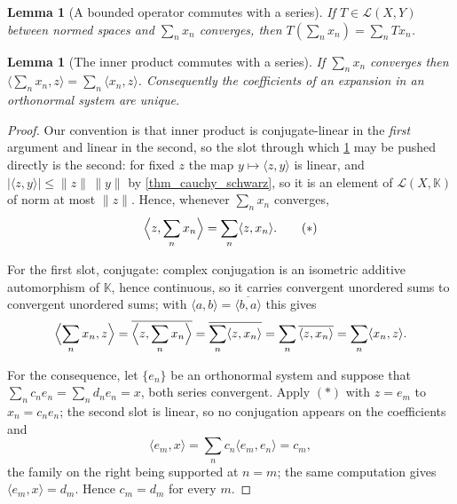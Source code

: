 \documentclass[a4paper]{report}
\theoremstyle{plain}
\newtheorem{lemma}[theorem]{Lemma}
\theoremstyle{definition}
\theoremstyle{remark}
\begin{document}
\begin{lemma}[A bounded operator commutes with a series]
  \label{lem_operator_through_series}
  If $T \in \mathcal{L}(X,Y)$ between normed spaces and $\sum_n x_n$ converges, then
  $T(\sum_n x_n) = \sum_n Tx_n$.
\end{lemma}


\begin{lemma}[The inner product commutes with a series]
  \label{lem_inner_through_series}
  If $\sum_n x_n$ converges then
  $\langle \sum_n x_n, z\rangle = \sum_n \langle x_n, z\rangle$.  Consequently the
  coefficients of an expansion in an orthonormal system are unique.
\end{lemma}
\begin{proof}
  Our convention is that inner product is conjugate-linear in the \emph{first} argument and linear in
  the second, so the slot through which \cref{lem_operator_through_series} may be pushed
  directly is the second: for fixed $z$ the map $y \mapsto \langle z,y\rangle$ is linear,
  and $|\langle z,y\rangle| \le \|z\|\,\|y\|$ by \cref{thm_cauchy_schwarz}, so it is an
  element of $\mathcal{L}(X,\mathbb{K})$ of norm at most $\|z\|$.
  Hence, whenever $\sum_n x_n$ converges,
  \begin{equation}
    \Bigl\langle z, \sum_n x_n\Bigr\rangle = \sum_n \langle z, x_n\rangle . \tag{$*$}
  \end{equation}

  For the first slot, conjugate: complex conjugation is an isometric additive automorphism
  of $\mathbb{K}$, hence continuous, so it carries convergent unordered sums to convergent
  unordered sums; with
  $\langle a,b\rangle = \overline{\langle b,a\rangle}$ this
  gives
  \[
    \Bigl\langle \sum_n x_n, z\Bigr\rangle
      = \overline{\Bigl\langle z, \sum_n x_n\Bigr\rangle}
      = \overline{\sum_n \langle z,x_n\rangle}
      = \sum_n \overline{\langle z,x_n\rangle}
      = \sum_n \langle x_n, z\rangle .
  \]

  For the consequence, let $\{e_n\}$ be an orthonormal system and suppose that
  $\sum_n c_ne_n = \sum_n d_ne_n = x$, both series convergent.  Apply $(*)$ with
  $z = e_m$ to $x_n = c_ne_n$; the second slot is linear, so no conjugation appears on the
  coefficients and
  \[
    \langle e_m, x\rangle = \sum_n c_n\langle e_m,e_n\rangle = c_m ,
  \]
  the family on the right being supported at $n=m$; the same computation gives
  $\langle e_m,x\rangle = d_m$.  Hence $c_m = d_m$ for every $m$.
\end{proof}
\end{document}
